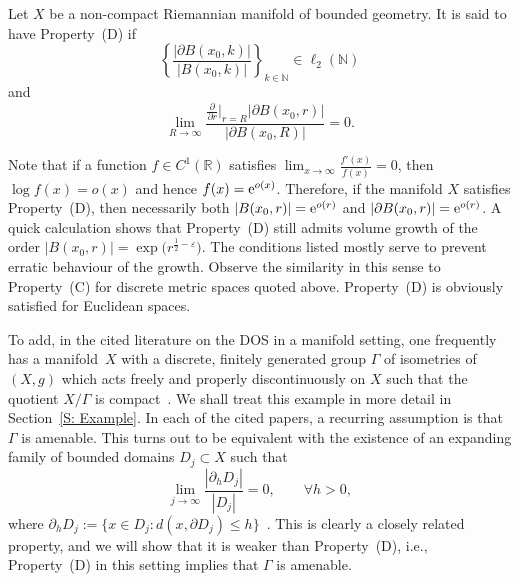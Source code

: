 \documentclass[pdftex]{sigma}
\numberwithin{equation}{section}
\newcommand{\abs}[1]{\lvert#1\rvert}
\begin{document}
\begin{Definition}[Property~(D)]\label{D:Property_D}
 Let $X$ be a non-compact Riemannian manifold of bounded geometry. It is said to have Property~(D) if
\begin{equation*}%
\left \{ \frac{\abs{\partial B(x_0, k)}}{\abs{B(x_0,k)}}\right\}_{k\in \mathbb{N}} \in \ell_2(\mathbb{N})
\end{equation*}
and
\begin{equation*}%
 \lim_{R\to \infty} \frac{\frac{\partial}{\partial r}\big |_{r=R} |\partial B(x_0, r)|}{|\partial B(x_0,R)|} = 0.
\end{equation*}
\end{Definition}

Note that if a function $f\in C^1(\mathbb{R})$ satisfies $\lim_{x\to \infty}\frac{f'(x)}{f(x)}= 0$, then $\log f(x) = o(x)$ and hence $f(x) = {\rm e}^{o(x)}$. Therefore, if the manifold $X$ satisfies Property~(D),
 then necessarily both $|B(x_0,r)| ={\rm e}^{o(r)}$ and $|\partial B(x_0, r)| = {\rm e}^{o(r)}$. A quick calculation shows that Property~(D) still admits volume growth of the order $|B(x_0, r)| = \exp \big(r^{\frac{1}{2}-\varepsilon}\big)$. The conditions listed mostly serve to prevent erratic behaviour of the growth. Observe the similarity in this sense to Property~(C) for discrete metric spaces quoted above. Property~(D) is obviously satisfied for Euclidean spaces.

To add, in the cited literature on the DOS in a manifold setting, one frequently has a manifold~$X$ with a discrete, finitely generated group $\Gamma$ of isometries of $(X,g)$ which acts freely and properly discontinuously on $X$ such that the quotient $X/\Gamma$ is compact~\cite{AdachiSunada1993, LenzPeyerimhoff2008, LenzPeyerimhoff2004, PeyerimhoffVeselic2002, Veselic2008}. We shall treat this example in more detail in Section~\ref{S: Example}. In each of the cited papers, a recurring assumption is that $\Gamma$ is amenable. This turns out to be equivalent with the existence of an expanding family of bounded domains $D_j\subset X$ such that
\[
\lim_{j \to \infty} \frac{|\partial_h D_j|}{|D_j|} = 0, \qquad \forall h>0,
\]
where $\partial_h D_j := \{x \in D_j \colon d(x, \partial D_j) \leq h \}$~\cite{AdachiSunada1993}. This is clearly a closely related property, and we will show that it is weaker than Property~(D), i.e., Property~(D) in this setting implies that $\Gamma$ is amenable.
\end{document}
